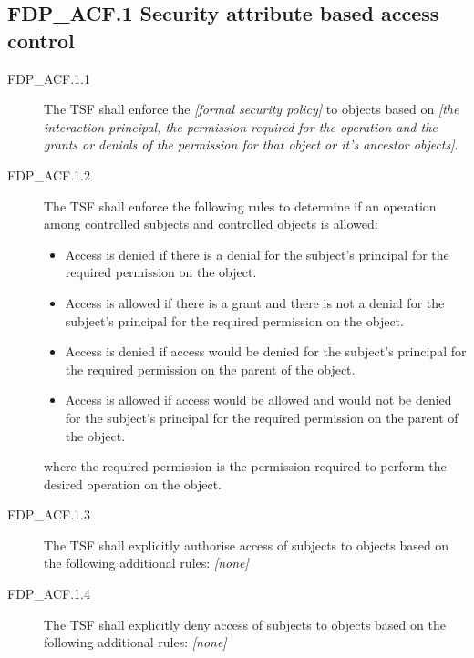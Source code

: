 \documentclass[12pt,english]{scrbook}
\begin{document}



\subsection{FDP{\_}ACF.1 Security attribute based access control}
\begin{description}
\item[FDP{\_}ACF.1.1]

The TSF shall enforce the \emph{{[}formal security policy]} to objects
based on \emph{{[}the interaction principal, the permission required for
the operation and the grants or denials of the permission for that
object or it's ancestor objects]}.

\item[FDP{\_}ACF.1.2]

The TSF shall enforce the following rules to determine
if an operation among controlled subjects and controlled objects is
allowed:
\begin{itemize}
\item {} 
Access is denied if there is a denial for the subject's
principal for the required permission on the object.

\item {} 
Access is allowed if there is a grant and there is not a denial
for the subject's principal for the required permission on the object.

\item {} 
Access is denied if access would be denied for the subject's
principal for the required permission on the parent of the
object.

\item {} 
Access is allowed if access would be allowed and would not be
denied for the subject's principal for the required permission
on the parent of the object.

\end{itemize}

where the required permission is the permission required to
perform the desired operation on the object.

\item[FDP{\_}ACF.1.3]

The TSF shall explicitly authorise access of subjects to
objects based on the following additional rules: \emph{{[}none]}

\item[FDP{\_}ACF.1.4]

The TSF shall explicitly deny access of subjects to objects
based on the following additional rules: \emph{{[}none]}

\end{description}
\end{document}
